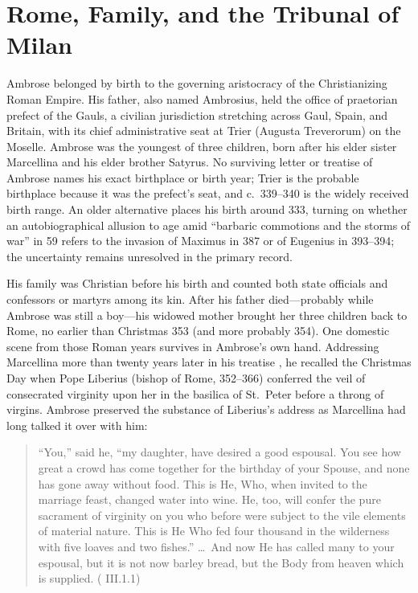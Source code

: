 \section{Rome, Family, and the Tribunal of Milan}

Ambrose belonged by birth to the governing aristocracy of the Christianizing Roman Empire. His father, also named Ambrosius, held the office of praetorian prefect of the Gauls, a civilian jurisdiction stretching across Gaul, Spain, and Britain, with its chief administrative seat at Trier (Augusta Treverorum) on the Moselle. Ambrose was the youngest of three children, born after his elder sister Marcellina and his elder brother Satyrus. No surviving letter or treatise of Ambrose names his exact birthplace or birth year; Trier is the probable birthplace because it was the prefect's seat, and c.~339--340 is the widely received birth range. An older alternative places his birth around 333, turning on whether an autobiographical allusion to age amid ``barbaric commotions and the storms of war'' in  59 refers to the invasion of Maximus in 387 or of Eugenius in 393--394; the uncertainty remains unresolved in the primary record.

His family was Christian before his birth and counted both state officials and confessors or martyrs among its kin. After his father died---probably while Ambrose was still a boy---his widowed mother brought her three children back to Rome, no earlier than Christmas 353 (and more probably 354). One domestic scene from those Roman years survives in Ambrose's own hand. Addressing Marcellina more than twenty years later in his treatise , he recalled the Christmas Day when Pope Liberius (bishop of Rome, 352--366) conferred the veil of consecrated virginity upon her in the basilica of St.~Peter before a throng of virgins. Ambrose preserved the substance of Liberius's address as Marcellina had long talked it over with him:

\begin{quote}
``You,'' said he, ``my daughter, have desired a good espousal. You see how great a crowd has come together for the birthday of your Spouse, and none has gone away without food. This is He, Who, when invited to the marriage feast, changed water into wine. He, too, will confer the pure sacrament of virginity on you who before were subject to the vile elements of material nature. This is He Who fed four thousand in the wilderness with five loaves and two fishes.'' \ldots\ And now He has called many to your espousal, but it is not now barley bread, but the Body from heaven which is supplied. ( III.1.1)
\end{quote}

